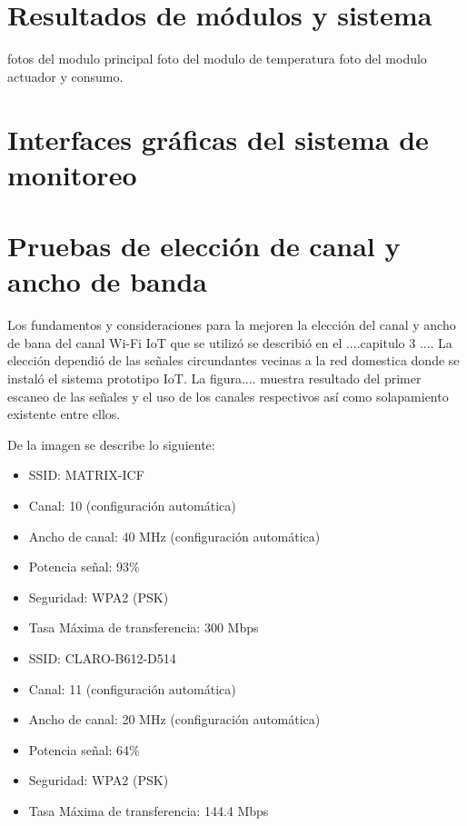 \section{Resultados de módulos y sistema}

fotos del modulo principal
foto del modulo de temperatura
foto del modulo actuador y consumo.
\section{Interfaces gráficas del sistema de monitoreo}

\section{Pruebas de elección de canal y ancho de banda}


Los fundamentos y consideraciones para la mejoren la elección del canal y ancho de bana del canal Wi-Fi IoT que se utilizó se describió en el ....capitulo 3 .... La elección dependió de las señales circundantes vecinas a la red domestica donde se instaló el sistema prototipo IoT. La figura.... muestra resultado del primer escaneo de las señales y el uso de los canales respectivos así como solapamiento existente entre ellos. 

De la imagen se describe lo siguiente:

\begin{itemize}
\item SSID: MATRIX-ICF
\item Canal: 10 (configuración automática)
\item Ancho de canal: 40 MHz (configuración automática)
\item Potencia señal: 93\%
\item Seguridad:  WPA2 (PSK)
\item Tasa Máxima de transferencia: 300 Mbps
\end{itemize}


\begin{itemize} 
\item SSID: CLARO-B612-D514
\item Canal: 11 (configuración automática)
\item Ancho de canal: 20 MHz (configuración automática)
\item Potencia señal: 64\%
\item Seguridad: WPA2 (PSK)
\item Tasa Máxima de transferencia: 144.4 Mbps
\end{itemize}

